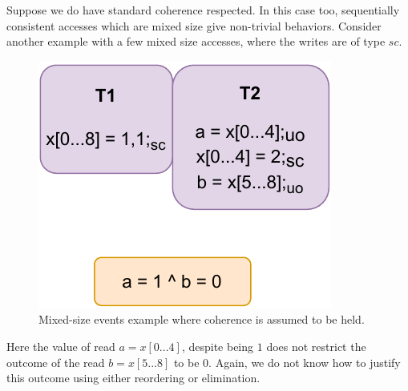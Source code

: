         Suppose we do have standard coherence respected. 
        In this case too, sequentially consistent accesses which are mixed size give non-trivial behaviors.
        Consider another example with a few mixed size accesses, where the writes are of type $sc$.

        \begin{figure}[H]
            \centering
            \includegraphics[scale=0.7]{7.ConclusionFutureWork/CoherenceMixed.pdf}
            \caption{Mixed-size events example where coherence is assumed to be held.}
        \end{figure}

        Here the value of read $a=x[0...4]$, despite being $1$ does not restrict the outcome of the read $b=x[5...8]$ to be $0$. 
        Again, we do not know how to justify this outcome using either reordering or elimination. 
